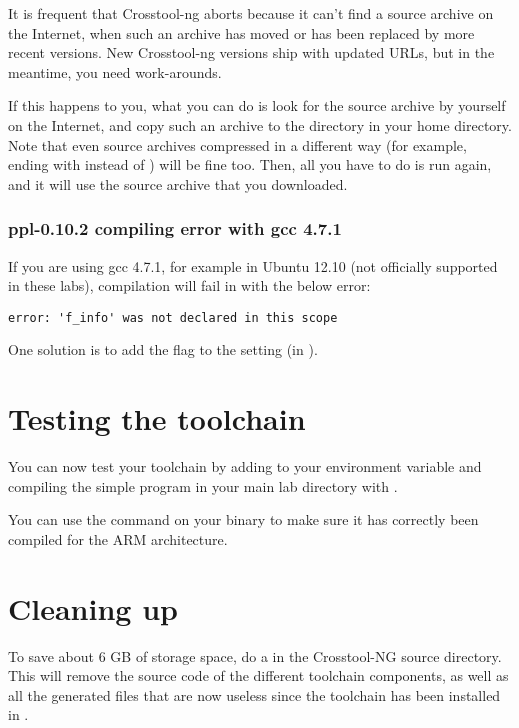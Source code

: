 It is frequent that Crosstool-ng aborts because it can't find a
source archive on the Internet, when such an archive has moved or has
been replaced by more recent versions. New Crosstool-ng versions ship
with updated URLs, but in the meantime, you need work-arounds.

If this happens to you, what you can do is look for the source archive by
yourself on the Internet, and copy such an archive to the 
directory in your home directory. Note that even source archives
compressed in a different way (for example, ending with 
instead of ) will be fine too. Then, all you have to do is run
 again, and it will use the source archive that you
downloaded.

\subsubsection{ppl-0.10.2 compiling error with gcc 4.7.1}

If you are using gcc 4.7.1, for example in Ubuntu 12.10 (not officially
supported in these labs), compilation will fail in  with
the below error:

\begin{verbatim}
error: 'f_info' was not declared in this scope
\end{verbatim}

One solution is to add the  flag to the
 setting (in ).

\section{Testing the toolchain}

You can now test your toolchain by adding
 to your
 environment variable and compiling the simple
 program in your main lab directory with
.

You can use the  command on your binary to make sure it has
correctly been compiled for the ARM architecture.

\section{Cleaning up}

To save about 6 GB of storage space, do a  in the
Crosstool-NG source directory. This will remove the source code of the
different toolchain components, as well as all the generated files
that are now useless since the toolchain has been installed in
.
